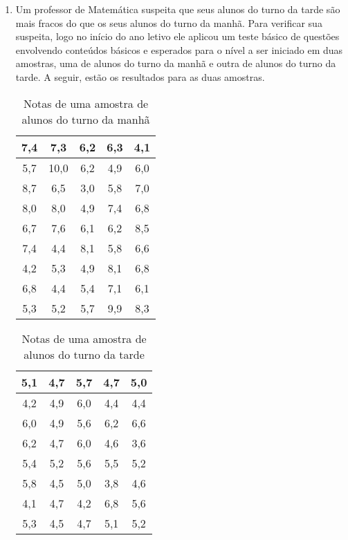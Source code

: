 {{{\begin{enumerate}
Se X, Y e Z são, respectivamente, a média, a mediana e a moda desta distribuição, então:
\begin{enumerate}
\item {} 
X = Y \textless{} Z                 b) Z \textless{} X = Y    c) Y \textless{} Z \textless{} X            d) Z \textless{} X \textless{} Y    e) Z \textless{} Y \textless{} X

\end{enumerate}

\item Um professor de Matemática suspeita que seus alunos do turno da tarde são mais fracos do que os seus alunos do turno da manhã. Para verificar sua suspeita, logo no início do ano letivo ele aplicou um teste básico de questões envolvendo conteúdos básicos e esperados para o nível a ser iniciado em duas amostras, uma de alunos do turno da manhã e outra de alunos do turno da tarde. A seguir, estão os resultados para as duas amostras.

\begin{multicols}{2}
\begin{table}[H]
\caption{Notas de uma amostra de alunos do turno da manhã}
\centering
\begin{tabular}{|c|c|c|c|c|}
\hline
7,4 & 7,3 & 6,2 & 6,3 & 4,1 \\
\hline
5,7 & 10,0 & 6,2 & 4,9 & 6,0 \\
\hline
8,7 & 6,5 & 3,0 & 5,8 & 7,0 \\
\hline
8,0 & 8,0 & 4,9 & 7,4 & 6,8 \\
\hline
6,7 & 7,6 & 6,1 & 6,2 & 8,5 \\
\hline
7,4 & 4,4 & 8,1 & 5,8 & 6,6 \\
\hline
4,2 & 5,3 & 4,9 & 8,1 & 6,8 \\
\hline
6,8 & 4,4 & 5,4 & 7,1 & 6,1 \\
\hline
5,3 & 5,2 & 5,7 & 9,9 & 8,3 \\
\hline
\end{tabular}
\end{table}

\columnbreak

\begin{table}[H]
\centering
\caption{Notas de uma amostra de alunos do turno da tarde}
\begin{tabular}{|c|c|c|c|c|}
\hline
5,1 & 4,7 & 5,7 & 4,7 & 5,0 \\
\hline
4,2 & 4,9 & 6,0 & 4,4 & 4,4 \\
\hline
6,0 & 4,9 & 5,6 & 6,2 & 6,6 \\
\hline
6,2 & 4,7 & 6,0 & 4,6 & 3,6 \\
\hline
5,4 & 5,2 & 5,6 & 5,5 & 5,2 \\
\hline
5,8 & 4,5 & 5,0 & 3,8 & 4,6 \\
\hline
4,1 & 4,7 & 4,2 & 6,8 & 5,6 \\
\hline
5,3 & 4,5 & 4,7 & 5,1 & 5,2 \\
\hline
\end{tabular}
\vfill
\end{table}


\end{multicols}
\end{enumerate}}}}
